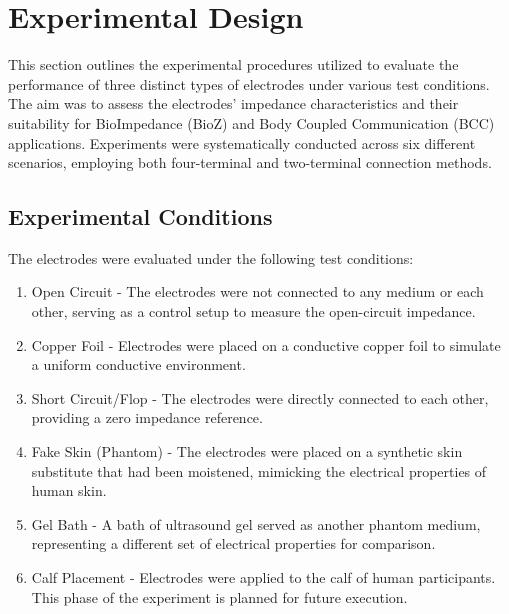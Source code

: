 \section{Experimental Design}

This section outlines the experimental procedures utilized to evaluate the performance of three distinct types of electrodes under various test conditions. The aim was to assess the electrodes' impedance characteristics and their suitability for BioImpedance (BioZ) and Body Coupled Communication (BCC) applications. Experiments were systematically conducted across six different scenarios, employing both four-terminal and two-terminal connection methods.

\subsection{Experimental Conditions}
The electrodes were evaluated under the following test conditions:
\begin{enumerate}
    \item Open Circuit - The electrodes were not connected to any medium or each other, serving as a control setup to measure the open-circuit impedance.
    \item Copper Foil - Electrodes were placed on a conductive copper foil to simulate a uniform conductive environment.
    \item Short Circuit/Flop - The electrodes were directly connected to each other, providing a zero impedance reference.
    \item Fake Skin (Phantom) - The electrodes were placed on a synthetic skin substitute that had been moistened, mimicking the electrical properties of human skin.
    \item Gel Bath - A bath of ultrasound gel served as another phantom medium, representing a different set of electrical properties for comparison.
    \item Calf Placement - Electrodes were applied to the calf of human participants. This phase of the experiment is planned for future execution.
\end{enumerate}

